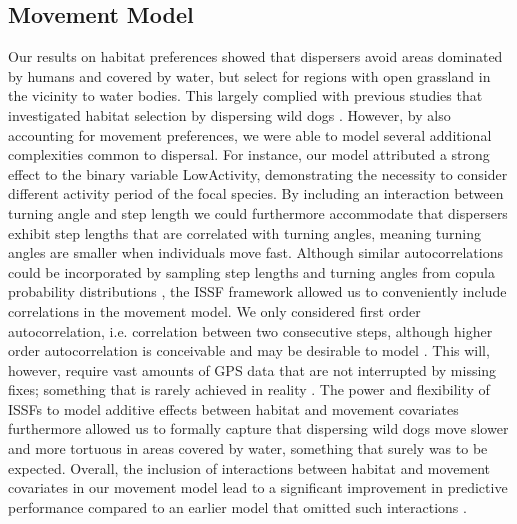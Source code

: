 \documentclass[abstract=on,10pt,a4paper,bibliography=totocnumbered]{article}
\begin{document}
\subsection{Movement Model}
Our results on habitat preferences showed that dispersers avoid areas dominated
by humans and covered by water, but select for regions with open grassland in
the vicinity to water bodies. This largely complied with previous studies that
investigated habitat selection by dispersing wild dogs
\citep{DaviesMostert.2012, Masenga.2016, Woodroffe.2019, Oneill.2020,
Hofmann.2021}. However, by also accounting for movement preferences, we were
able to model several additional complexities common to dispersal. For instance,
our model attributed a strong effect to the binary variable
\textsf{LowActivity}, demonstrating the necessity to consider different activity
period of the focal species. By including an interaction between turning angle
and step length we could furthermore accommodate that dispersers exhibit step
lengths that are correlated with turning angles, meaning turning angles are
smaller when individuals move fast. Although similar autocorrelations could be
incorporated by sampling step lengths and turning angles from copula probability
distributions \citep{Hodel.2021a, Hodel.2021b}, the ISSF framework allowed us to
conveniently include correlations in the movement model. We only considered
first order autocorrelation, i.e. correlation between two consecutive steps,
although higher order autocorrelation is conceivable and may be desirable to
model \citep{Dray.2010, McClintock.2012}. This will, however, require vast
amounts of GPS data that are not interrupted by missing fixes; something that is
rarely achieved in reality \citep{Graves.2006}. The power and flexibility of
ISSFs to model additive effects between habitat and movement covariates
\citep{Avgar.2016, Signer.2017} furthermore allowed us to formally capture that
dispersing wild dogs move slower and more tortuous in areas covered by water,
something that surely was to be expected. Overall, the inclusion of interactions
between habitat and movement covariates in our movement model lead to a
significant improvement in predictive performance compared to an earlier model
that omitted such interactions \citep{Hofmann.2021}.
\end{document}
